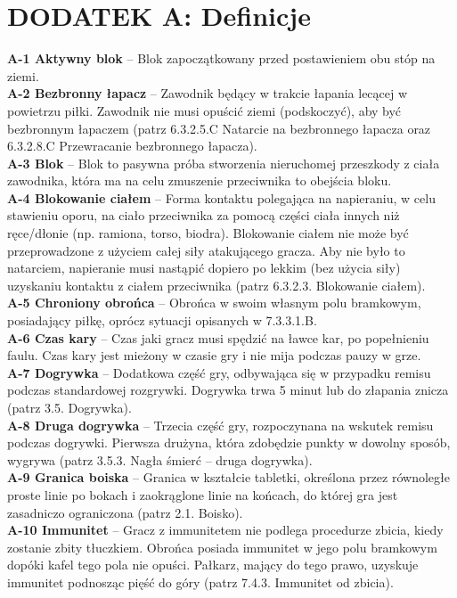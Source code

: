 \documentclass[12pt,a4paper]{article}
\newcommand{\psection}[1]{
  \section*{#1}
  \addcontentsline{toc}{section}{#1}
}
\begin{document}
\psection{DODATEK A: Definicje}
\textbf{A-1 Aktywny blok} – Blok zapoczątkowany przed postawieniem obu stóp na ziemi. \\
\textbf{A-2 Bezbronny łapacz} – Zawodnik będący w trakcie łapania lecącej w powietrzu piłki. Zawodnik nie musi opuścić ziemi (podskoczyć), aby być bezbronnym łapaczem (patrz 6.3.2.5.C Natarcie na bezbronnego łapacza oraz 6.3.2.8.C Przewracanie bezbronnego łapacza).\\
\textbf{A-3 Blok} – Blok to pasywna próba stworzenia nieruchomej przeszkody z ciała zawodnika, która ma na celu zmuszenie przeciwnika to obejścia bloku.\\
\textbf{A-4 Blokowanie ciałem} – Forma kontaktu polegająca na napieraniu, w celu stawieniu oporu, na ciało przeciwnika za pomocą części ciała innych niż ręce/dłonie (np. ramiona, torso, biodra). Blokowanie ciałem nie może być przeprowadzone z użyciem całej siły atakującego gracza. Aby nie było to natarciem, napieranie musi nastąpić dopiero po lekkim (bez użycia siły) uzyskaniu kontaktu z ciałem przeciwnika (patrz 6.3.2.3. Blokowanie ciałem).\\
\textbf{A-5 Chroniony obrońca} – Obrońca w swoim własnym polu bramkowym, posiadający piłkę, oprócz sytuacji opisanych w 7.3.3.1.B.\\
\textbf{A-6 Czas kary} – Czas jaki gracz musi spędzić na ławce kar, po popełnieniu faulu. Czas kary jest mieżony w czasie gry i nie mija podczas pauzy w grze.\\
\textbf{A-7 Dogrywka} – Dodatkowa część gry, odbywająca się w przypadku remisu podczas standardowej rozgrywki. Dogrywka trwa 5 minut lub do złapania znicza (patrz 3.5. Dogrywka).\\
\textbf{A-8 Druga dogrywka} – Trzecia część gry, rozpoczynana na wskutek remisu podczas dogrywki. Pierwsza drużyna, która zdobędzie punkty w dowolny sposób, wygrywa (patrz 3.5.3. Nagła śmierć – druga dogrywka).\\
\textbf{A-9 Granica boiska} – Granica w kształcie tabletki, określona przez równoległe proste linie po bokach i zaokrąglone linie na końcach, do której gra jest zasadniczo ograniczona (patrz 2.1. Boisko).\\
\textbf{A-10 Immunitet} – Gracz z immunitetem nie podlega procedurze zbicia, kiedy zostanie zbity tłuczkiem. Obrońca posiada immunitet w jego polu bramkowym dopóki kafel tego pola nie opuści. Pałkarz, mający do tego prawo, uzyskuje immunitet podnosząc pięść do góry (patrz 7.4.3. Immunitet od zbicia).\\
\end{document}
